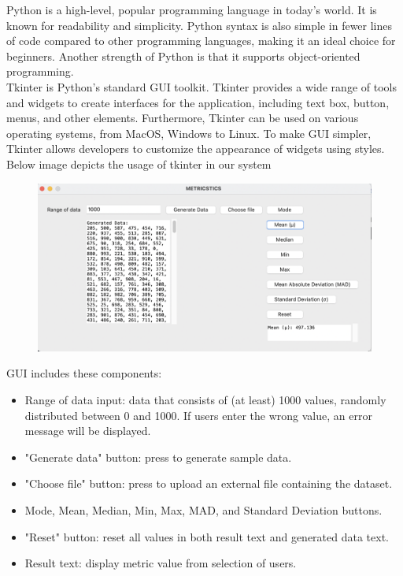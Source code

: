 {{{\normalsize{Python is a high-level, popular programming language in today’s world. It is known for readability and simplicity. Python syntax is also simple in fewer lines of code compared to other programming languages, making it an ideal choice for beginners. Another strength of Python is that it supports object-oriented programming.\linebreak} \\
\normalsize{Tkinter is Python’s standard GUI toolkit. Tkinter provides a wide range of tools and widgets to create interfaces for the application, including text box, button, menus, and other elements. Furthermore, Tkinter can be used on various operating systems, from MacOS, Windows to Linux. To make GUI simpler, Tkinter allows developers to customize the appearance of widgets using styles.  Below image depicts the usage of tkinter in our system}

\label{sec: Figure 10}
\begin{figure}[htp]
    \centering
    \includegraphics[width=16cm]{p10.png}
    \label{fig:Figure 10}
\end{figure}

\pagebreak

\normalsize{GUI includes these components:}
\begin{itemize}[noitemsep]
    \item Range of data input: data that consists of (at least) 1000 values, randomly distributed between 0 and 1000. If users enter the wrong value, an error message will be displayed.
    \item "Generate data" button: press to generate sample data.
    \item "Choose file" button: press to upload an external file containing the dataset.
    \item Mode, Mean, Median, Min, Max, MAD, and Standard Deviation buttons.
    \item "Reset" button: reset all values in both result text and generated data text.
    \item Result text: display metric value from selection of users.
\end{itemize}

}}}
